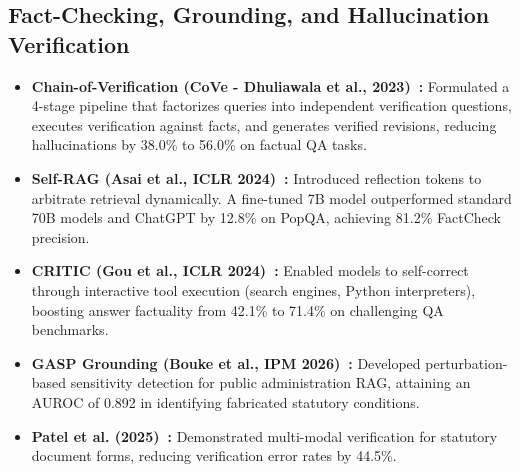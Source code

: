 \documentclass[11pt,a4paper]{article}
\begin{document}
\subsection{Fact-Checking, Grounding, and Hallucination Verification}
\begin{itemize}
    \item \textbf{Chain-of-Verification (CoVe - Dhuliawala et al., 2023)~\cite{dhuliawala2023cove}:} Formulated a 4-stage pipeline that factorizes queries into independent verification questions, executes verification against facts, and generates verified revisions, reducing hallucinations by 38.0\% to 56.0\% on factual QA tasks.
    \item \textbf{Self-RAG (Asai et al., ICLR 2024)~\cite{asai2024self}:} Introduced reflection tokens to arbitrate retrieval dynamically. A fine-tuned 7B model outperformed standard 70B models and ChatGPT by 12.8\% on PopQA, achieving 81.2\% FactCheck precision.
    \item \textbf{CRITIC (Gou et al., ICLR 2024)~\cite{gou2024critic}:} Enabled models to self-correct through interactive tool execution (search engines, Python interpreters), boosting answer factuality from 42.1\% to 71.4\% on challenging QA benchmarks.
    \item \textbf{GASP Grounding (Bouke et al., IPM 2026)~\cite{bouke2026gasp}:} Developed perturbation-based sensitivity detection for public administration RAG, attaining an AUROC of 0.892 in identifying fabricated statutory conditions.
    \item \textbf{Patel et al. (2025)~\cite{patel2025multimodal}:} Demonstrated multi-modal verification for statutory document forms, reducing verification error rates by 44.5\%.
\end{itemize}
\end{document}
